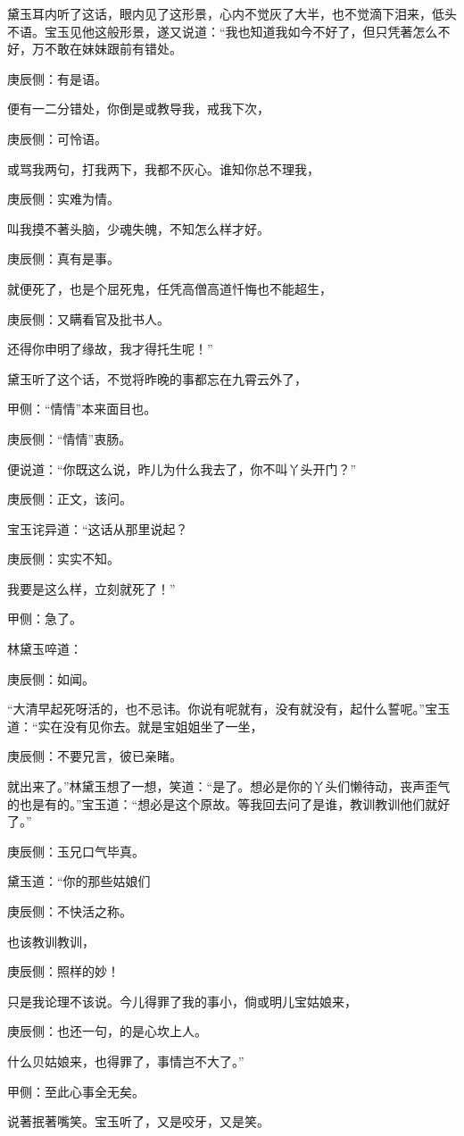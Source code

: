 \begin{parag}
    黛玉耳内听了这话，眼内见了这形景，心内不觉灰了大半，也不觉滴下泪来，低头不语。宝玉见他这般形景，遂又说道：“我也知道我如今不好了，但只凭著怎么不好，万不敢在妹妹跟前有错处。\begin{note}庚辰侧：有是语。\end{note}便有一二分错处，你倒是或教导我，戒我下次，\begin{note}庚辰侧：可怜语。\end{note}或骂我两句，打我两下，我都不灰心。谁知你总不理我，\begin{note}庚辰侧：实难为情。\end{note}叫我摸不著头脑，少魂失魄，不知怎么样才好。\begin{note}庚辰侧：真有是事。\end{note}就便死了，也是个屈死鬼，任凭高僧高道忏悔也不能超生，\begin{note}庚辰侧：又瞒看官及批书人。\end{note}还得你申明了缘故，我才得托生呢！”
\end{parag}


\begin{parag}
    黛玉听了这个话，不觉将昨晚的事都忘在九霄云外了，\begin{note}甲侧：“情情”本来面目也。\end{note}\begin{note}庚辰侧：“情情”衷肠。\end{note}便说道：“你既这么说，昨儿为什么我去了，你不叫丫头开门？”\begin{note}庚辰侧：正文，该问。\end{note}宝玉诧异道：“这话从那里说起？\begin{note}庚辰侧：实实不知。\end{note}我要是这么样，立刻就死了！”\begin{note}甲侧：急了。\end{note}林黛玉啐道：\begin{note}庚辰侧：如闻。\end{note}“大清早起死呀活的，也不忌讳。你说有呢就有，没有就没有，起什么誓呢。”宝玉道：“实在没有见你去。就是宝姐姐坐了一坐，\begin{note}庚辰侧：不要兄言，彼已亲睹。\end{note}就出来了。”林黛玉想了一想，笑道：“是了。想必是你的丫头们懒待动，丧声歪气的也是有的。”宝玉道：“想必是这个原故。等我回去问了是谁，教训教训他们就好了。”\begin{note}庚辰侧：玉兄口气毕真。\end{note}黛玉道：“你的那些姑娘们\begin{note}庚辰侧：不快活之称。\end{note}也该教训教训，\begin{note}庚辰侧：照样的妙！\end{note}只是我论理不该说。今儿得罪了我的事小，倘或明儿宝姑娘来，\begin{note}庚辰侧：也还一句，的是心坎上人。\end{note}什么贝姑娘来，也得罪了，事情岂不大了。”\begin{note}甲侧：至此心事全无矣。\end{note}说著抿著嘴笑。宝玉听了，又是咬牙，又是笑。
\end{parag}


